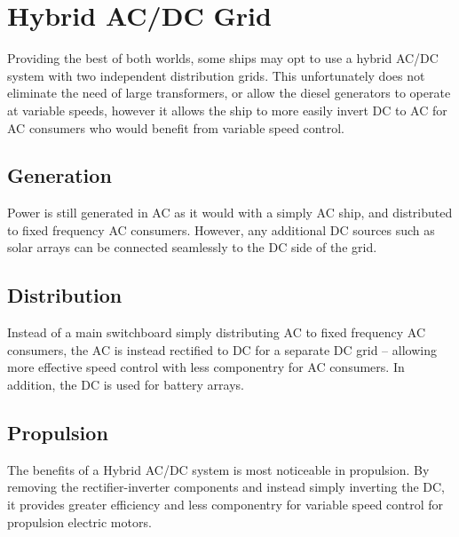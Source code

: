 \documentclass[11pt,a4paper]{article}
\begin{document}
\section{Hybrid AC/DC Grid}
Providing the best of both worlds, some ships may opt to use a hybrid AC/DC system with two independent distribution grids. This unfortunately does not eliminate the need of large transformers, or allow the diesel generators to operate at variable speeds, however it allows the ship to more easily invert DC to AC for AC consumers who would benefit from variable speed control.
\subsection*{Generation}
Power is still generated in AC as it would with a simply AC ship, and distributed to fixed frequency AC consumers. However, any additional DC sources such as solar arrays can be connected seamlessly to the DC side of the grid.
\subsection*{Distribution}
Instead of a main switchboard simply distributing AC to fixed frequency AC consumers, the AC is instead rectified to DC for a separate DC grid -- allowing more effective speed control with less componentry for AC consumers. In addition, the DC is used for battery arrays.
\subsection*{Propulsion}
The benefits of a Hybrid AC/DC system is most noticeable in propulsion. By removing the rectifier-inverter components and instead simply inverting the DC, it provides greater efficiency and less componentry for variable speed control for propulsion electric motors.
\end{document}
